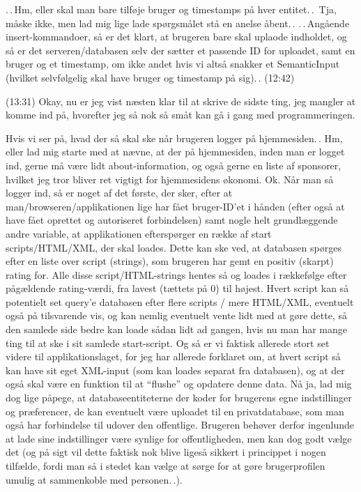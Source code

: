 \documentclass{report}
\begin{document}
.\,.\,Hm, eller skal man bare tilføje bruger og timestamps på hver entitet.\,.\, Tja, måske ikke, men lad mig lige lade spørgsmålet stå en anelse åbent.\,. .\,.\,Angående insert-kommandoer, så er det klart, at brugeren bare skal uplaode indholdet, og så er det serveren/databasen selv der sætter et passende ID for uploadet, samt en bruger og et timestamp, om ikke andet hvis vi altså snakker et SemanticInput (hvilket selvfølgelig skal have bruger og timestamp på sig).\,. (12:42)

(13:31) Okay, nu er jeg vist næsten klar til at skrive de sidste ting, jeg mangler at komme ind på, hvorefter jeg så nok så småt kan gå i gang med programmeringen.

Hvis vi ser på, hvad der så skal ske når brugeren logger på hjemmesiden.\,. Hm, eller lad mig starte med at nævne, at der på hjemmesiden, inden man er logget ind, gerne må være lidt about-information, og også gerne en liste af sponsorer, hvilket jeg tror bliver ret vigtigt for hjemmesidens økonomi. Ok. Når man så logger ind, så er noget af det første, der sker, efter at man/browseren/applikationen lige har fået bruger-ID'et i hånden (efter også at have fået oprettet og autoriseret forbindelsen) samt nogle helt grundlæggende andre variable, at applikationen efterspørger en række af start scripts/HTML/XML, der skal loades. Dette kan ske ved, at databasen spørges efter en liste over script (strings), som brugeren har gemt en positiv (skarpt) rating for. Alle disse script/HTML-strings hentes så og loades i rækkefølge efter pågældende rating-værdi, fra lavest (tættets på 0) til højest. Hvert script kan så potentielt set query'e databasen efter flere scripts / mere HTML/XML, eventuelt også på tilsvarende vis, og kan nemlig eventuelt vente lidt med at gøre dette, så den samlede side bedre kan loade sådan lidt ad gangen, hvis nu man har mange ting til at ske i sit samlede start-script. Og så er vi faktisk allerede stort set videre til applikationslaget, for jeg har allerede forklaret om, at hvert script så kan have sit eget XML-input (som kan loades separat fra databasen), og at der også skal være en funktion til at ``flushe'' og opdatere denne data. Nå ja, lad mig dog lige påpege, at databaseentiteterne der koder for brugerens egne indstillinger og præferencer, de kan eventuelt være uploadet til en privatdatabase, som man også har forbindelse til udover den offentlige. Brugeren behøver derfor ingenlunde at lade sine indstillinger være synlige for offentligheden, men kan dog godt vælge det (og på sigt vil dette faktisk nok blive ligeså sikkert i princippet i nogen tilfælde, fordi man så i stedet kan vælge at sørge for at gøre brugerprofilen umulig at sammenkoble med personen.\,.). 
\end{document}
